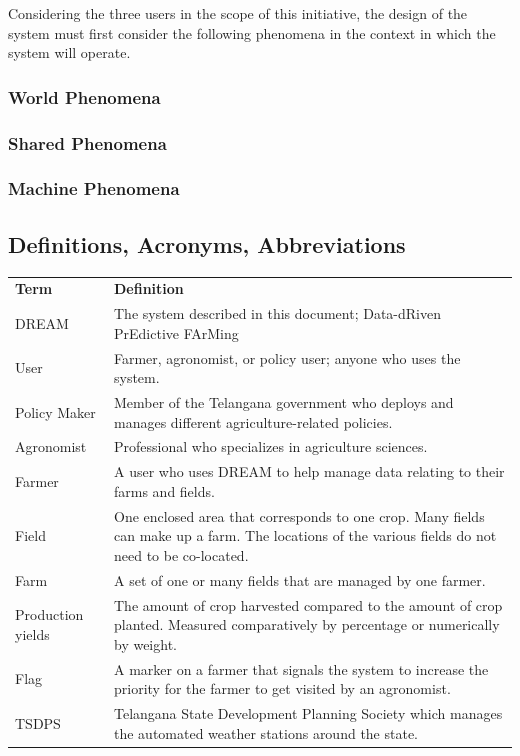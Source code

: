 \begin{flushleft} 
Considering the three users in the scope of this initiative, the design of the system must first consider the following phenomena in the context in which the system will operate.  

\subsubsection{World Phenomena}

\smallskip
\subsubsection{Shared Phenomena}

\smallskip
\subsubsection{Machine Phenomena}

\smallskip
\end{flushleft}

\subsection{Definitions, Acronyms, Abbreviations}


\begin{center}
\renewcommand{\arraystretch}{1.25}
\begin{tabular}{l >{\raggedright\arraybackslash}p{12cm} } \hline
    \textbf{Term} & \textbf{Definition}\\ 
    DREAM & The system described in this document; Data-dRiven PrEdictive FArMing\\
    User & Farmer, agronomist, or policy user; anyone who uses the system.\\
	Policy Maker & Member of the Telangana government who deploys and manages different agriculture-related policies. \\
	Agronomist & Professional who specializes in agriculture sciences. \\
    Farmer & A user who uses DREAM to help manage data relating to their farms and fields.\\
    Field & One enclosed area that corresponds to one crop. Many fields can make up a farm. The locations of the various fields do not need to be co-located.\\
    Farm & A set of one or many fields that are managed by one farmer.\\
    Production yields & The amount of crop harvested compared to the amount of crop planted. Measured comparatively by percentage or numerically by weight.\\
    Flag & A marker on a farmer that signals the system to increase the priority for the farmer to get visited by an agronomist.\\
    TSDPS & Telangana State Development Planning Society which manages the automated weather stations around the state. \\
    \hline
\end{tabular}
\end{center}

